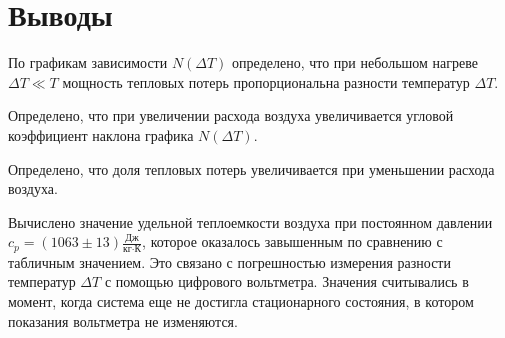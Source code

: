 \section{Выводы}

По графикам зависимости $N(\Delta T)$ определено, что при небольшом нагреве $\Delta T \ll T$ мощность тепловых потерь пропорциональна разности температур $\Delta T$.

Определено, что при увеличении расхода воздуха увеличивается угловой коэффициент наклона графика $N(\Delta T)$.

Определено, что доля тепловых потерь увеличивается при уменьшении расхода воздуха.

Вычислено значение удельной теплоемкости воздуха при постоянном давлении $c_p = (1063 \pm 13)\frac{\text{Дж}}{\text{кг} \cdot \text{К}}$, которое оказалось завышенным по сравнению с табличным значением. Это связано с погрешностью измерения разности температур $\Delta T$ с помощью цифрового вольтметра. Значения считывались в момент, когда система еще не достигла стационарного состояния, в котором показания вольтметра не изменяются.

